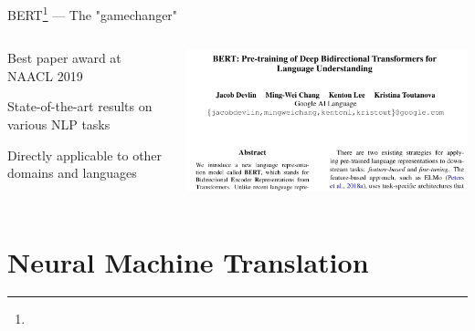 \documentclass[12pt,aspectratio=169,handout]{beamer}
\begin{document}
\begin{frame}{BERT\footnote{} --- The "gamechanger"}
	
	\begin{columns}
		\begin{column}{0.5\textwidth}
			Best paper award at NAACL 2019
			
			\bigskip
			
			State-of-the-art results on various NLP tasks
			
			\bigskip
			
			Directly applicable to other domains and languages
			
			
		\end{column}
		\begin{column}{0.5\textwidth}
			\includegraphics[width=\linewidth]{img/bert-paper01.png}
		\end{column}
	\end{columns}
	
\end{frame}




\section{Neural Machine Translation}
\end{document}
